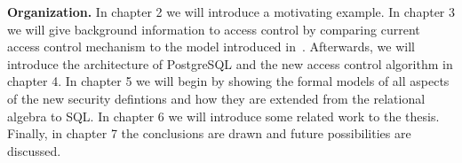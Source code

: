 \smallskip
\noindent
{\bf Organization.}
%
%
In chapter 2 we will introduce a motivating example.
%
In chapter 3 we will give background information to access control by comparing current access control mechanism to the model introduced in~\cite{guarnieri2016strong}.
%
Afterwards, we will introduce the architecture of PostgreSQL and the new access control algorithm in chapter 4. 
%
In chapter 5 we will begin by showing the formal models of all aspects of the new security defintions and how they are extended from the relational algebra to SQL.  
%
In chapter 6 we will introduce some related work to the thesis. 
%
Finally, in chapter 7 the conclusions are drawn and future possibilities are discussed.